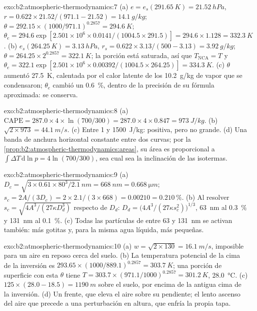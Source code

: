 \begin{solution}{exo:b2:atmospheric-thermodynamics:7}
(a) $e = e_s(\qty{291.65}{K}) = \qty{21.52}{hPa}$, $r = 0.622 \times 21.52/(971.1 - 21.52) =
\qty{14.1}{g/kg}$; $\theta = 292.15 \times (1000/971.1)^{0.2857} = \qty{294.6}{K}$; $\theta_e =
294.6 \exp[2.501 \times 10^6 \times 0.0141/(1004.5 \times 291.5)] = 294.6 \times 1.128 =
\qty{332.3}{K}$. (b) $e_s(\qty{264.25}{K}) = \qty{3.13}{hPa}$, $r_s = 0.622 \times 3.13/(500 -
3.13) = \qty{3.92}{g/kg}$; $\theta = 264.25 \times 2^{0.2857} = \qty{322.1}{K}$; la porción está
saturada, así que $T_{\text{NCA}} = T$ y $\theta_e = 322.1 \exp[2.501 \times 10^6 \times
0.00392/(1004.5 \times 264.25)] = \qty{334.3}{K}$. (c) $\theta$ aumentó \qty{27.5}{K}, calentada
por el calor latente de los \qty{10.2}{g/kg} de vapor que se condensaron; $\theta_e$ cambió un
\qty{0.6}{\percent}, dentro de la precisión de su fórmula aproximada: se conserva.
\end{solution}

\begin{solution}{exo:b2:atmospheric-thermodynamics:8}
(a) $\text{CAPE} = 287.0 \times 4 \times \ln(700/300) = 287.0 \times 4 \times 0.847 =
\qty{973}{J/kg}$. (b) $\sqrt{2 \times 973} = \qty{44.1}{m/s}$. (c) Entre 1 y
\qty{1500}{J/kg}: positiva, pero no grande. (d) Una banda de anchura horizontal constante entre dos
curvas; por la \cref{prop:b2:atmospheric-thermodynamics:areas}, su área es proporcional a $\int
\Delta T\,\mathrm{d}\ln p = 4 \ln(700/300)$, sea cual sea la inclinación de las isotermas.
\end{solution}

\begin{solution}{exo:b2:atmospheric-thermodynamics:9}
(a) $D_c = \sqrt{3 \times 0.61 \times 80^3/2.1}\,\unit{nm} = \qty{668}{nm} =
\qty{0.668}{\micro m}$; $s_c = 2A/(3D_c) = 2 \times 2.1/(3 \times 668) = 0.00210 =
\qty{0.210}{\percent}$. (b) Al resolver $s_c = \sqrt{4A^3/(27\kappa D_d^3)}$ respecto de $D_d$: $D_d =
\bigl(4A^3/(27\kappa s_c^2)\bigr)^{1/3}$, \qty{63}{nm} al \qty{0.3}{\percent} y \qty{131}{nm} al
\qty{0.1}{\percent}. (c) Todas las partículas de entre 63 y \qty{131}{nm} se activan también: más
gotitas y, para la misma agua líquida, más pequeñas.
\end{solution}

\begin{solution}{exo:b2:atmospheric-thermodynamics:10}
(a) $w = \sqrt{2 \times 130} = \qty{16.1}{m/s}$, imposible para un aire en reposo cerca del suelo.
(b) La temperatura potencial de la cima de la inversión es $293.65 \times (1000/889.1)^{0.2857} =
\qty{303.7}{K}$; una porción de superficie con esta $\theta$ tiene $T = 303.7 \times (971.1/1000)^{0.2857}
= \qty{301.2}{K}$, \qty{28.0}{\celsius}. (c) $125 \times (28.0 - 18.5) = \qty{1190}{m}$ sobre el
suelo, por encima de la antigua cima de la inversión. (d) Un frente, que eleva el aire sobre su pendiente; el lento ascenso
del aire que precede a una perturbación en altura, que enfría la propia tapa.
\end{solution}

